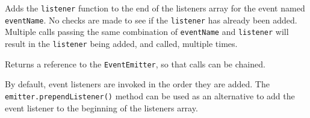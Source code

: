 Adds the \texttt{listener} function to the end of the listeners array
for the event named \texttt{eventName}. No checks are made to see if the
\texttt{listener} has already been added. Multiple calls passing the
same combination of \texttt{eventName} and \texttt{listener} will result
in the \texttt{listener} being added, and called, multiple times.

\begin{Shaded}
\begin{Highlighting}[]
\NormalTok{(}\OperatorTok{,}\KeywordTok{=\textgreater{}}\NormalTok{ \{}
  \NormalTok{(}\NormalTok{)}\OperatorTok{;}
\NormalTok{\})}\OperatorTok{;}
\end{Highlighting}
\end{Shaded}

Returns a reference to the \texttt{EventEmitter}, so that calls can be
chained.

By default, event listeners are invoked in the order they are added. The
\texttt{emitter.prependListener()} method can be used as an alternative
to add the event listener to the beginning of the listeners array.

\begin{Shaded}
\begin{Highlighting}[]
\NormalTok{ \{ }\NormalTok{ \} } \OperatorTok{;}
\OperatorTok{=}  \NormalTok{()}\OperatorTok{;}
\NormalTok{(}\OperatorTok{,}\NormalTok{ () }\KeywordTok{=\textgreater{}} \NormalTok{(}\NormalTok{))}\OperatorTok{;}
\NormalTok{(}\OperatorTok{,}\NormalTok{ () }\KeywordTok{=\textgreater{}} \NormalTok{(}\NormalTok{))}\OperatorTok{;}
\NormalTok{(}\NormalTok{)}\OperatorTok{;}
\end{Highlighting}
\end{Shaded}

